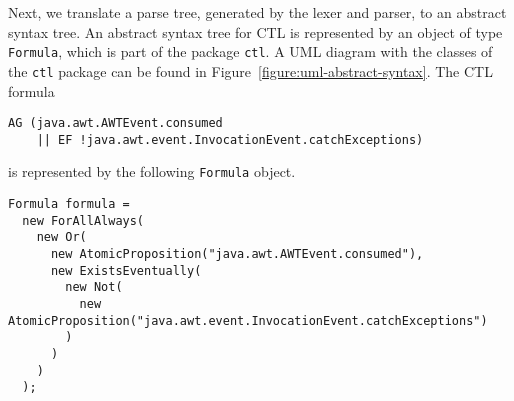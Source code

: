 \documentclass[12pt]{article}
\theoremstyle{definition}
\begin{document}
Next, we translate a parse tree, generated by the lexer and parser, to an abstract syntax tree.  An abstract syntax tree for CTL is represented by an object of type \lstinline{Formula}, which is part of the package \lstinline{ctl}.  A UML diagram with the classes of the \lstinline{ctl} package can be found in Figure~\ref{figure:uml-abstract-syntax}.  The CTL formula
\begin{lstlisting}
AG (java.awt.AWTEvent.consumed 
    || EF !java.awt.event.InvocationEvent.catchExceptions)
\end{lstlisting}
is represented by the following \lstinline{Formula} object.
\begin{lstlisting}
Formula formula =
  new ForAllAlways(
    new Or(
      new AtomicProposition("java.awt.AWTEvent.consumed"),
      new ExistsEventually(
        new Not(
          new AtomicProposition("java.awt.event.InvocationEvent.catchExceptions")
        )
      )
    )
  );
\end{lstlisting}
\end{document}
